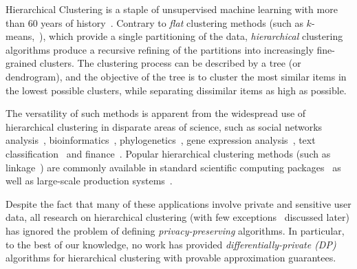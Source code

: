 Hierarchical Clustering is a staple of unsupervised machine learning with more than 60 years of history~\citep{ward1963hierarchical}.
Contrary to {\it flat} clustering methods (such as $k$-means,~\citet{J10}), which provide a single partitioning of the data, {\it hierarchical} clustering algorithms produce a recursive refining of the partitions into increasingly fine-grained clusters. 
The clustering process can be described by a tree (or dendrogram), and the objective of the tree is to cluster the most similar items in the lowest possible clusters, while separating dissimilar items as high as possible.

The versatility of such methods is apparent from the widespread use of hierarchical clustering in disparate areas of science, such as social networks analysis~\citep{leskovec2014mining,mann2008use}, bioinformatics~\citep{diez2015novel},  phylogenetics~\citep{sneath1962numerical,jardine1968model}, gene expression analysis~\citep{eisen1998cluster}, text classification~\citep{steinbach2000} and  finance~\citep{tumminello2010correlation}. Popular hierarchical clustering methods (such as linkage~\citep{J10}) are commonly available in standard scientific computing packages~\citep{virtanen2020scipy} as well as large-scale  production systems~\citep{bateni2017affinity, dhulipala2022hierarchical}.

Despite the fact that many of these applications involve private and sensitive user data, all research on hierarchical clustering (with few exceptions~\citep{kolluri2021private, xiao2014differentially} discussed later) has ignored the problem of defining {\it  privacy-preserving} algorithms. In particular, to the best of our knowledge, no work has provided {\it differentially-private (DP)}~\citep{dwork2014algorithmic} algorithms for hierarchical clustering with provable approximation guarantees. 

